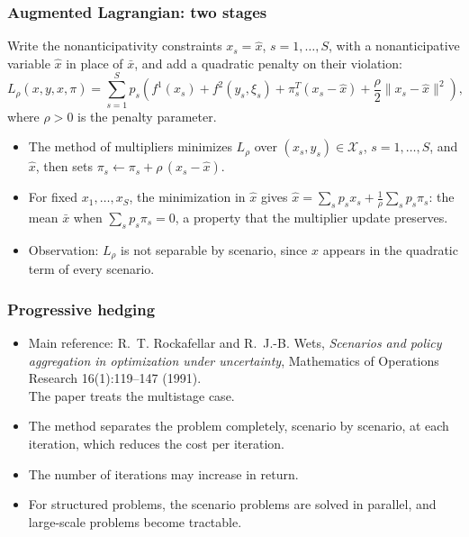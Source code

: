 \documentclass[aspectratio=169]{beamer}
\def\cX{\mathcal{X}}
\begin{document}




\begin{frame}
\frametitle{Augmented Lagrangian: two stages}

Write the nonanticipativity constraints $x_s = \hat{x}$, $s = 1, \ldots, S$, with a nonanticipative variable $\hat{x}$ in place of $\bar{x}$, and add a quadratic penalty on their violation:
\[
L_\rho(x, y, \hat{x}, \pi) = \sum_{s=1}^{S} p_s \left( f^1(x_s) + f^2(y_s,\xi_s) + \pi_s^T(x_s-\hat{x}) + \frac{\rho}{2} \| x_s-\hat{x} \|^2\right),
\]
where $\rho > 0$ is the penalty parameter.
\begin{itemize}
\item
The method of multipliers minimizes $L_\rho$ over $(x_s, y_s) \in \cX_s$, $s = 1,\ldots,S$, and $\hat{x}$, then sets $\pi_s \leftarrow \pi_s + \rho\, (x_s - \hat{x})$.
\item
For fixed $x_1, \ldots, x_S$, the minimization in $\hat{x}$ gives $\hat{x} = \sum_s p_s x_s + \frac{1}{\rho} \sum_s p_s \pi_s$: the mean $\bar{x}$ when $\sum_s p_s \pi_s = 0$, a property that the multiplier update preserves.
\item
{\red Observation}: $L_\rho$ is not separable by scenario, since $\hat{x}$ appears in the quadratic term of every scenario.
\end{itemize}

\end{frame}

\begin{frame}
\frametitle{Progressive hedging}

\begin{itemize}
\item
Main reference:
R.~T. Rockafellar and R.~J.-B. Wets, {\sl Scenarios and policy aggregation
in optimization under uncertainty}, Mathematics of Operations
  Research 16(1):119--147 (1991).\\
  The paper treats the multistage case.
\item
The method separates the problem completely, scenario by scenario, at each iteration, which reduces the cost per iteration.
\item
The number of iterations may increase in return.
\item
For structured problems, the scenario problems are solved in parallel, and large-scale problems become tractable.
\end{itemize}

\end{frame}
\end{document}
